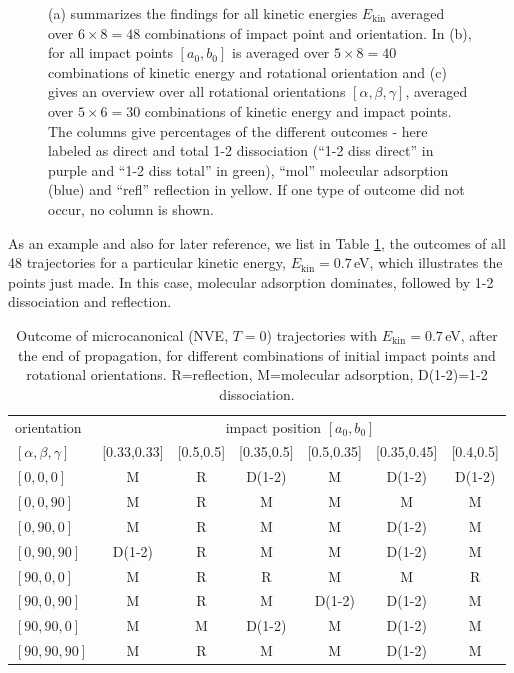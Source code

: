 \documentclass[11pt,DIV=13,BCOR=5mm,a4paper,headinclude]{scrbook}
\begin{document}
\begin{figure}[!h]
{(a) summarizes the findings for all kinetic energies $E_\textrm{kin}$ averaged over $6\times 8=48$ combinations of impact point and orientation.
In (b), for all impact points $[a_0,b_0]$ is averaged over $5 \times 8=40$ combinations of kinetic energy and rotational orientation and (c) gives an overview over all rotational orientations $[\alpha,\beta,\gamma]$, averaged over $5 \times 6=30$ combinations of kinetic energy and impact points.
The columns give percentages of the different outcomes - here labeled as direct and total 1-2 dissociation (``1-2 diss direct'' in purple and  ``1-2 diss total'' in green), ``mol'' molecular adsorption (blue) and ``refl'' reflection in yellow.
If one type of outcome did not occur, no column is shown.}
\label{abb:barchart_mic}
\end{figure}

As an example and also for later reference, we list in Table \ref{tab:NVE-clean},  the outcomes of all 48 trajectories for a particular kinetic energy, $E_\textrm{kin}=0.7\,$eV, which illustrates the points just made.
In this case, molecular adsorption dominates, followed by 1-2 dissociation and reflection.
\\
\begin{table}[!h]
  \centering
  \caption{Outcome of microcanonical (NVE, $T=0$) trajectories with $E_{\textrm{kin}}=0.7\,$eV, after the end of propagation, for different combinations of initial impact points and rotational orientations.
  R=reflection, M=molecular adsorption, D(1-2)=1-2 dissociation.}
  \begin{tabular}{l|cccccc}
    \toprule
    orientation& \multicolumn{6}{c}{impact position $[a_0,b_0]$} \\
    $[\alpha,\beta,\gamma]$ & [0.33,0.33] & [0.5,0.5] & [0.35,0.5] & [0.5,0.35] & [0.35,0.45] & [0.4,0.5] \\
    \midrule
  $[0,0,0]$    &M &R &D(1-2) &M &D(1-2) & D(1-2)\\
  $[0,0,90]$  &M &R &M & M  & M & M\\
  $[0,90,0]$  &M &R &M & M  &D(1-2) & M \\
  $[0,90,90]$ &D(1-2) &R & M &M &D(1-2) & M\\
  $[90,0,0]$   &M &R &R & M  & M &R \\
  $[90,0,90]$ &M &R &M &D(1-2) &D(1-2) & M \\
  $[90,90,0]$  &M &M &D(1-2) &M &D(1-2) & M \\
  $[90,90,90]$ &M &R &M &M  &D(1-2) &M \\
    \bottomrule
  \end{tabular}
  \label{tab:NVE-clean}
\end{table}
\end{document}
